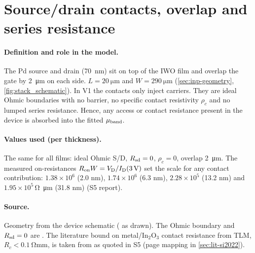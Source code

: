 \section{Source/drain contacts, overlap and series resistance}\label{sec:par-contacts}

\paragraph{Definition and role in the model.}
The Pd source and drain (\SI{70}{nm}) sit on top of the IWO film and overlap the gate by \SI{2}{\micro\metre} on each side. $L=\SI{20}{\micro\metre}$ and $W=\SI{290}{\micro\metre}$ (\cref{sec:inp-geometry}, \cref{fig:stack_schematic}). In V1 the contacts only inject carriers. They are ideal Ohmic boundaries with no barrier, no specific contact resistivity $\rho_c$ and no lumped series resistance. Hence, any access or contact resistance present in the device is absorbed into the fitted $\mu_{\mathrm{band}}$.

\paragraph{Values used (per thickness).}
The same for all films: ideal Ohmic S/D, $R_{\mathrm{sd}}=0$, $\rho_c=0$, overlap \SI{2}{\micro\metre}. The measured on-resistances $R_{\mathrm{on}}W=V_{\mathrm{D}}/I_{\mathrm{D}}(\SI{3}{V})$ set the scale for any contact contribution: $1.38\times10^{6}$ (2.0 nm), $1.74\times10^{6}$ (6.3 nm), $2.28\times10^{5}$ (13.2 nm) and $1.95\times10^{5}$\,\si{\ohm\micro\metre} (31.8 nm) (S5 report).

\paragraph{Source.}
Geometry from the device schematic ( as drawn). The Ohmic boundary and $R_{\mathrm{sd}}=0$ are . The literature bound on metal/In$_2$O$_3$ contact resistance from TLM, $R_c<\SI{0.1}{\ohm\milli\metre}$, is taken from \citet[p.~167]{Si2022} as quoted in S5 (page mapping in \cref{sec:lit-si2022}).

